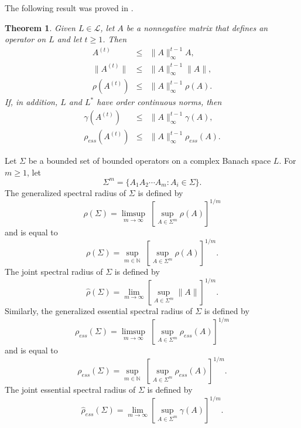 \documentclass[12pt, reqno]{amsart}
\newtheorem{theorem}{Theorem}[section]
\theoremstyle{definition}
\theoremstyle{remark}
\numberwithin{equation}{section}
\newcommand{\be}{\begin{equation}}
\newcommand{\ee}{\end{equation}}
\newcommand{\CC}{\mathbb{C}} %
\newcommand{\NN}{\mathbb{N}}
\begin{document}
The following result was proved in \cite[Corollary 2.10]{P21}.
\begin{theorem}  Given $L\in \mathcal{L}$, let $A$ be a nonnegative matrix that defines an operator on $L$ and let $t\ge 1$. Then 
\begin{eqnarray}
A^{(t)} &\le & \|A\|_{\infty} ^{t-1} A, \\
\label{norm_imp_t}
\|A^{(t)}\| &\le & \|A\|_{\infty} ^{t-1} \| A\|, \\
\label{dobra_t}
\rho(A^{(t)} )&\le & \|A\|_{\infty} ^{t-1}\rho( A). 
\end{eqnarray} 
If, in addition, $L$ and $L^*$ have order continuous norms, then
\begin{eqnarray}
\label{dobra_gamma}
\gamma (A^{(t)})&\le & \|A\|_{\infty} ^{t-1} \gamma(A), \\
\label{dobra_r_ess}
\rho_{ess}(A^{(t)} )&\le & \|A\|_{\infty} ^{t-1}\rho_{ess}(A). 
\end{eqnarray} 
\end{theorem}





\bigskip

Let $\Sigma$ be a bounded set of bounded operators on a complex Banach space $L$.
For $m \ge 1$, let
$$\Sigma ^m =\{A_1A_2 \cdots A_m : A_i \in \Sigma\}.$$
The generalized spectral radius of $\Sigma$ is defined by
\be
\rho (\Sigma)= \limsup _{m \to \infty} \;[\sup _{A \in \Sigma ^m} \rho (A)]^{1/m}
\label{genrho}
\ee
and is equal to
$$\rho (\Sigma)= \sup _{m \in \NN} \;[\sup _{A \in \Sigma ^m} \rho (A)]^{1/m}.$$
The joint spectral radius of $\Sigma$ is defined by
\be
\hat{\rho}  (\Sigma)= \lim _{m \to \infty}[\sup _{A \in \Sigma ^m} \|A\|]^{1/m}.
\label{BW}
\ee
Similarly, the generalized essential spectral radius of $\Sigma$ is defined by
\be
\rho _{ess} (\Sigma)= \limsup _{m \to \infty} \;[\sup _{A \in \Sigma ^m} \rho _{ess} (A)]^{1/m}
\label{genrhoess}
\ee
and is equal to
$$\rho _{ess} (\Sigma)= \sup _{m \in \NN} \;[\sup _{A \in \Sigma ^m} \rho _{ess} (A)]^{1/m}.$$
The joint essential  spectral radius of $\Sigma$ is defined by
\be
\hat{\rho} _{ess}  (\Sigma)= \lim _{m \to \infty}[\sup _{A \in \Sigma ^m} \gamma (A)]^{1/m}.
\label{jointess}
\ee
\end{document}
